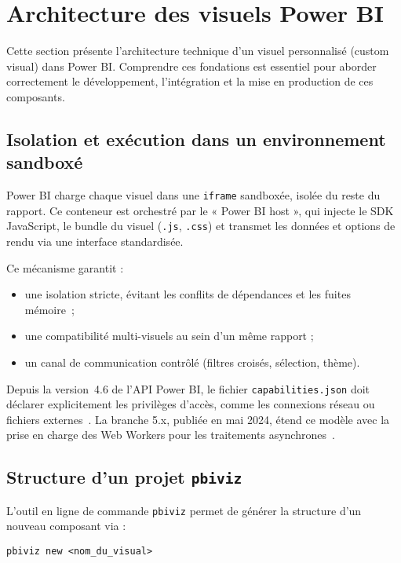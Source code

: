 \section{Architecture des visuels Power BI}
\label{sec:archi-powerbi}

Cette section présente l’architecture technique d’un visuel personnalisé (custom visual) dans Power BI. Comprendre ces fondations est essentiel pour aborder correctement le développement, l’intégration et la mise en production de ces composants.

\subsection{Isolation et exécution dans un environnement sandboxé}

Power BI charge chaque visuel dans une \texttt{iframe} sandboxée, isolée du reste du rapport. Ce conteneur est orchestré par le « Power BI host », qui injecte le SDK JavaScript, le bundle du visuel (\texttt{.js}, \texttt{.css}) et transmet les données et options de rendu via une interface standardisée.

Ce mécanisme garantit :
\begin{itemize}
  \item une isolation stricte, évitant les conflits de dépendances et les fuites mémoire~\parencite{MicrosoftSandbox2016};
  \item une compatibilité multi-visuels au sein d’un même rapport ;
  \item un canal de communication contrôlé (filtres croisés, sélection, thème).
\end{itemize}

Depuis la version~4.6 de l’API Power BI, le fichier \texttt{capabilities.json} doit déclarer explicitement les privilèges d’accès, comme les connexions réseau ou fichiers externes~\parencite{MSCapabilities2024}. La branche 5.x, publiée en mai 2024, étend ce modèle avec la prise en charge des Web Workers pour les traitements asynchrones~\parencite{PBIAPIV5_2025}.

\subsection{Structure d’un projet \texttt{pbiviz}}

L’outil en ligne de commande \texttt{pbiviz} permet de générer la structure d’un nouveau composant via :

\begin{verbatim}
pbiviz new <nom_du_visual>
\end{verbatim}

